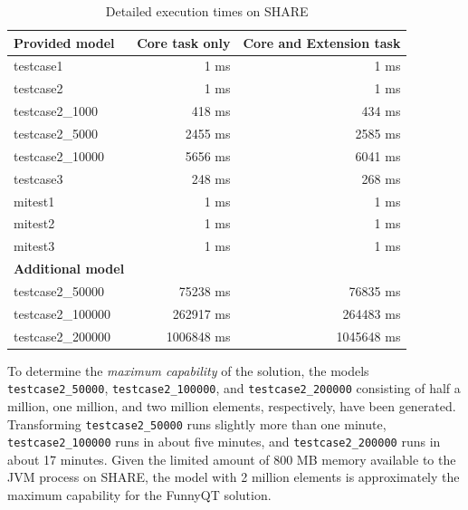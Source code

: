 \documentclass[submission]{eptcs}
\begin{document}
\begin{table}[htb]
  \centering
  \begin{tabular}{| l | r | r |}
    \hline
    \textbf{Provided model}    & \textbf{Core task only} & \textbf{Core and Extension task}\\
    \hline
    \textsf{testcase1}         & 1 ms      & 1 ms\\
    \textsf{testcase2}         & 1 ms      & 1 ms\\
    \textsf{testcase2\_1000}   & 418 ms    & 434 ms\\
    \textsf{testcase2\_5000}   & 2455 ms   & 2585 ms\\
    \textsf{testcase2\_10000}  & 5656 ms   & 6041 ms\\
    \textsf{testcase3}         & 248 ms    & 268 ms\\
    \hline
    \textsf{mitest1}           & 1 ms      & 1 ms\\
    \textsf{mitest2}           & 1 ms      & 1 ms\\
    \textsf{mitest3}           & 1 ms      & 1 ms\\
    \hline
    \textbf{Additional model}  & & \\
    \hline
    \textsf{testcase2\_50000}  & 75238 ms  & 76835 ms\\
    \textsf{testcase2\_100000} & 262917 ms & 264483 ms\\
    \textsf{testcase2\_200000} & 1006848 ms & 1045648 ms\\
    \hline
  \end{tabular}
  \caption{Detailed execution times on SHARE}
  \label{tab:exec-times}
\end{table}

\begin{sloppypar}
  To determine the \emph{maximum capability} of the solution, the models
  \verb|testcase2_50000|, \verb|testcase2_100000|, and \verb|testcase2_200000|
  consisting of half a million, one million, and two million elements,
  respectively, have been generated.  Transforming \verb|testcase2_50000| runs
  slightly more than one minute, \verb|testcase2_100000| runs in about five
  minutes, and \verb|testcase2_200000| runs in about 17 minutes.  Given the
  limited amount of 800 MB memory available to the JVM process on SHARE, the
  model with 2 million elements is approximately the maximum capability for the
  FunnyQT solution.
\end{sloppypar}

\FloatBarrier



\end{document}
